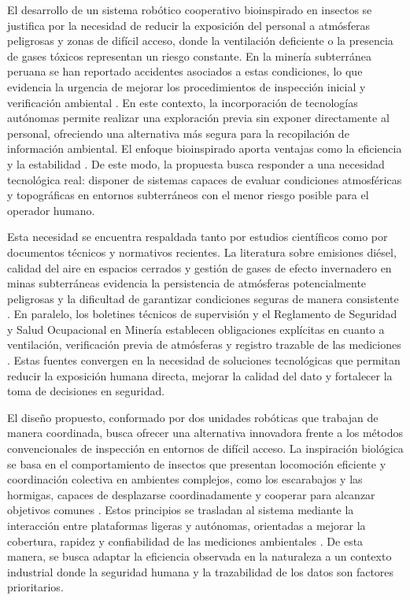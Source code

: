 El desarrollo de un sistema robótico cooperativo bioinspirado en insectos se justifica por la necesidad de reducir la exposición del personal a atmósferas peligrosas y zonas de difícil acceso, donde la ventilación deficiente o la presencia de gases tóxicos representan un riesgo constante. En la minería subterránea peruana se han reportado accidentes asociados a estas condiciones, lo que evidencia la urgencia de mejorar los procedimientos de inspección inicial y verificación ambiental \cite{OSINERGMIN_BoletinGSM_2020, MINEM_Yanaquihua_2023}. 
En este contexto, la incorporación de tecnologías autónomas permite realizar una exploración previa sin exponer directamente al personal, ofreciendo una alternativa más segura para la recopilación de información ambiental. El enfoque bioinspirado aporta ventajas como la eficiencia y la estabilidad \cite{InsectInspired_2020, DungBeetle_2021}. De este modo, la propuesta busca responder a una necesidad tecnológica real: disponer de sistemas capaces de evaluar condiciones atmosféricas y topográficas en entornos subterráneos con el menor riesgo posible para el operador humano.

Esta necesidad se encuentra respaldada tanto por estudios científicos como por documentos técnicos y normativos recientes. La literatura sobre emisiones diésel, calidad del aire en espacios cerrados y gestión de gases de efecto invernadero en minas subterráneas evidencia la persistencia de atmósferas potencialmente peligrosas y la dificultad de garantizar condiciones seguras de manera consistente \cite{EmisionesDiesel_2021,GEI_MinasPeru_2022,Cepa2023_sensors}. En paralelo, los boletines técnicos de supervisión y el Reglamento de Seguridad y Salud Ocupacional en Minería establecen obligaciones explícitas en cuanto a ventilación, verificación previa de atmósferas y registro trazable de las mediciones \cite{OSINERGMIN_BoletinGSM_2020b,MINEM_DS024_2016,MINEM_Yanaquihua_2023}. Estas fuentes convergen en la necesidad de soluciones tecnológicas que permitan reducir la exposición humana directa, mejorar la calidad del dato y fortalecer la toma de decisiones en seguridad.


El diseño propuesto, conformado por dos unidades robóticas que trabajan de manera coordinada, busca ofrecer una alternativa innovadora frente a los métodos convencionales de inspección en entornos de difícil acceso. La inspiración biológica se basa en el comportamiento de insectos que presentan locomoción eficiente y coordinación colectiva en ambientes complejos, como los escarabajos y las hormigas, capaces de desplazarse coordinadamente  y cooperar para alcanzar objetivos comunes \cite{InsectInspired_2020}. 
Estos principios se trasladan al sistema mediante la interacción entre plataformas ligeras y autónomas, orientadas a mejorar la cobertura, rapidez y confiabilidad de las mediciones ambientales \cite{FlappingFlight_2021}. De esta manera, se busca adaptar la eficiencia observada en la naturaleza a un contexto industrial donde la seguridad humana y la trazabilidad de los datos son factores prioritarios.


